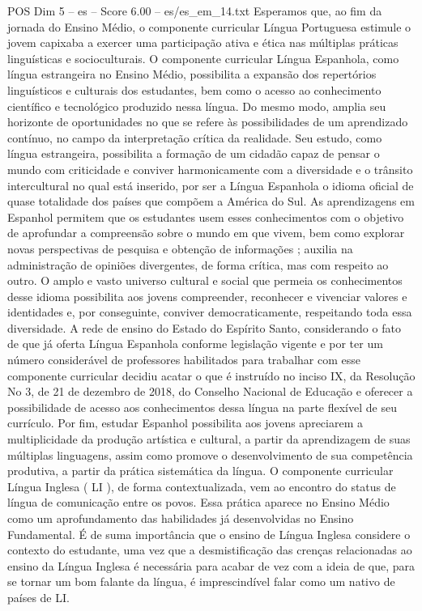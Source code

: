 \begin{textsample}{POS Dim 5 – es – Score 6.00 – es/es\_em\_14.txt}
Esperamos que, ao fim da jornada do Ensino Médio, o componente curricular Língua Portuguesa estimule o jovem capixaba a exercer uma participação ativa e ética nas múltiplas práticas linguísticas e socioculturais.
O componente curricular Língua Espanhola, como língua estrangeira no Ensino Médio, possibilita a expansão dos repertórios linguísticos e culturais dos estudantes, bem como o acesso ao conhecimento científico e tecnológico produzido nessa língua.
Do mesmo modo, amplia seu horizonte de oportunidades no que se refere às possibilidades de um aprendizado contínuo, no campo da interpretação crítica da realidade.
Seu estudo, como língua estrangeira, possibilita a formação de um cidadão capaz de pensar o mundo com criticidade e conviver harmonicamente com a diversidade e o trânsito intercultural no qual está inserido, por ser a Língua Espanhola o idioma oficial de quase totalidade dos países que compõem a América do Sul.
As aprendizagens em Espanhol permitem que os estudantes usem esses conhecimentos com o objetivo de aprofundar a compreensão sobre o mundo em que vivem, bem como explorar novas perspectivas de pesquisa e obtenção de informações ; auxilia na administração de opiniões divergentes, de forma crítica, mas com respeito ao outro.
O amplo e vasto universo cultural e social que permeia os conhecimentos desse idioma possibilita aos jovens compreender, reconhecer e vivenciar valores e identidades e, por conseguinte, conviver democraticamente, respeitando toda essa diversidade.
A rede de ensino do Estado do Espírito Santo, considerando o fato de que já oferta Língua Espanhola conforme legislação vigente e por ter um número considerável de professores habilitados para trabalhar com esse componente curricular decidiu acatar o que é instruído no inciso IX, da Resolução No 3, de 21 de dezembro de 2018, do Conselho Nacional de Educação e oferecer a possibilidade de acesso aos conhecimentos dessa língua na parte flexível de seu currículo.
Por fim, estudar Espanhol possibilita aos jovens apreciarem a multiplicidade da produção artística e cultural, a partir da aprendizagem de suas múltiplas linguagens, assim como promove o desenvolvimento de sua competência produtiva, a partir da prática sistemática da língua.
O componente curricular Língua Inglesa ( LI ), de forma contextualizada, vem ao encontro do status de língua de comunicação entre os povos.
Essa prática aparece no Ensino Médio como um aprofundamento das habilidades já desenvolvidas no Ensino Fundamental.
É de suma importância que o ensino de Língua Inglesa considere o contexto do estudante, uma vez que a desmistificação das crenças relacionadas ao ensino da Língua Inglesa é necessária para acabar de vez com a ideia de que, para se tornar um bom falante da língua, é imprescindível falar como um nativo de países de LI.

\end{textsample}

